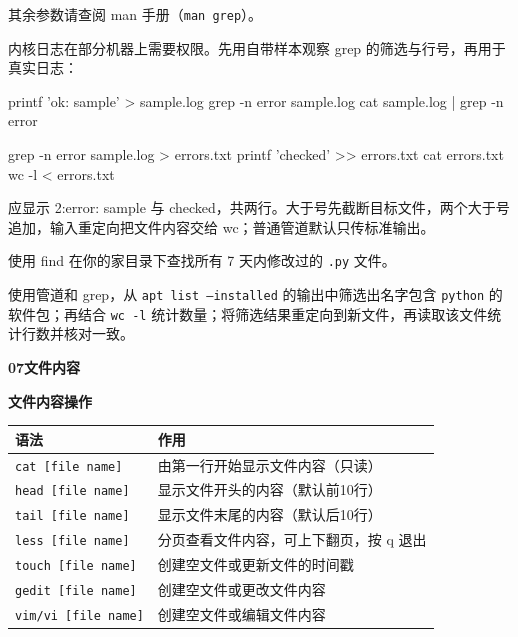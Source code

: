 其余参数请查阅 man 手册（\texttt{man grep}）。

\begin{example}
内核日志在部分机器上需要权限。先用自带样本观察 grep 的筛选与行号，再用于真实日志：


\begin{tbash}
printf 'ok\nerror: sample\nok\n' > sample.log
grep -n error sample.log
cat sample.log | grep -n error
\end{tbash}


\end{example}

\begin{example}[把筛选结果写入新文件]


\begin{tbash}
grep -n error sample.log > errors.txt
printf 'checked\n' >> errors.txt
cat errors.txt
wc -l < errors.txt
\end{tbash}


应显示 2:error: sample 与 checked，共两行。大于号先截断目标文件，两个大于号追加，输入重定向把文件内容交给 wc；普通管道默认只传标准输出。
\end{example}
\begin{exercise}\label{ex:v1-find-python}
使用 find 在你的家目录下查找所有 7 天内修改过的 \texttt{.py} 文件。
\end{exercise}

\begin{exercise}\label{ex:v1-pipe-count}
使用管道和 grep，从 \texttt{apt list --installed} 的输出中筛选出名字包含 \texttt{python} 的软件包；再结合 \texttt{wc -l} 统计数量；将筛选结果重定向到新文件，再读取该文件统计行数并核对一致。
\end{exercise}

\textbf{07文件内容}


\begin{table}[H]\centering
\textbf{文件内容操作}

	\begin{tabular}{p{}p{}}
		\toprule[1.5pt]
		语法 & 作用\\
		\midrule[1pt]
		\texttt{cat [file name]}		&由第一行开始显示文件内容（只读）\\
		\texttt{head [file name]}		&显示文件开头的内容（默认前10行）\\
		\texttt{tail [file name]}		&显示文件末尾的内容（默认后10行）\\
		\texttt{less [file name]}		&分页查看文件内容，可上下翻页，按 q 退出\\
		\texttt{touch [file name]}		&创建空文件或更新文件的时间戳\\
		\texttt{gedit [file name]}		&创建空文件或更改文件内容\\
		\texttt{vim/vi [file name]}		&创建空文件或编辑文件内容\\
		\bottomrule[1.5pt]
	\end{tabular}
\end{table}



